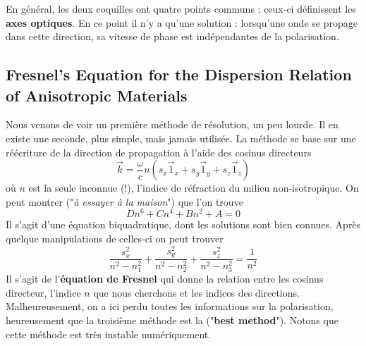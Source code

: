 \begin{enumerate}
En général, les deux coquilles ont quatre points communs : ceux-ci définissent les \textbf{axes optiques}. En
ce point il n'y a qu'une solution : lorsqu'une onde se propage dans cette direction, sa vitesse de phase est
indépendantes de la polarisation. 
\end{enumerate}

\subsection{Fresnel’s Equation for the Dispersion Relation of Anisotropic Materials}
Nous venons de voir un première méthode de résolution, un peu lourde. Il en existe une seconde, plus simple,
mais jamais utilisée. La méthode se base sur une réécriture de la direction de propagation à l'aide des
cosinus directeurs
\begin{equation}
\vec k = \dfrac{\omega}{c}n\left(s_x\vec 1_x+s_y\vec 1_y+s_z\vec 1_z\right)
\end{equation}
où $n$ est la seule inconnue (!), l'indice de réfraction du milieu non-isotropique. On peut montrer 
("\textit{à essayer à la maison}") que l'on trouve
\begin{equation}
Dn^6+Cn^4+Bn^2+A=0
\end{equation}
Il s'agit d'une équation biquadratique, dont les solutions sont bien connues. Après quelque manipulations
de celles-ci on peut trouver
\begin{equation}
\dfrac{s^2_x}{n^2-n^2_1}+
\dfrac{s^2_y}{n^2-n^2_2}+
\dfrac{s^2_z}{n^2-n^2_3} = \dfrac{1}{n^2}
\end{equation}
Il s'agit de l'\textbf{équation de Fresnel} qui donne la relation entre les cosinus directeur, l'indice
$n$ que nous cherchons et les indices des directions. Malheureusement, on a ici perdu toutes les informations
sur la polarisation, heureusement que la troisième méthode est la ("\textbf{best method}"). Notons que cette
méthode est très instable numériquement. 

